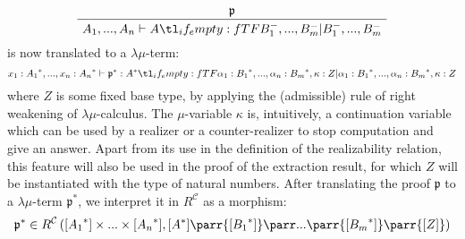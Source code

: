 \documentclass{CSML}
\renewcommand{\ldots}{...}
\newcommand*\ifpresent[3]{\tl_if_empty:fTF{#1}{#3}{#2}}
\newcommand*\AXM[1]{\AxiomC{$#1$}}
\newcommand*\UIM[1]{\UnaryInfC{$#1$}}
\newcommand*\DP\DisplayProof
\newcommand*\Entails{\mathrel{\vdash}}
\newcommand*\BarSep{\mathrel{|}}
\newcommand*\Sequent[3]{#1\Entails#2\ifpresent{#3}{\BarSep}{}#3}
\newcommand*\LogNeg[1]{{#1^-}}
\newcommand*\LogFormA{A}
\newcommand*\LogFormB{B}
\newcommand*\LogProofA{\mathfrak{p}}
\newcommand*\LmSortExtract{Z}
\newcommand*\LmTerm[2]{#1\mathrel{:}#2}
\newcommand*\LmVarA{x}
\newcommand*\LmMVarA\alpha
\newcommand*\LmInterpForm[1]{{#1}^*}
\newcommand*\LmInterpProof[1]{{#1}^*}
\newcommand*\CatC{\mathcal{C}}
\newcommand*\CatR{R}
\newcommand*\CatRC{\CatExp{\CatR}{\CatC}}
\newcommand*\CatTimes\times
\newcommand*\CatExp[2]{#1^{#2}}
\newcommand*\CatPar\parr
\newcommand*\CatInterpSort[1]{{\left[#1\right]}}
\begin{document}
$$\AXM{\LogProofA}\UIM{\Sequent{\LogFormA_1,\ldots,\LogFormA_n}{\LogFormA}{\LogNeg{\LogFormB_1},\ldots,\LogNeg{\LogFormB_m}}}\DP$$
is now translated to a $\lambda\mu$-term:
$$\Sequent{\LmTerm{\LmVarA_1}{\LmInterpForm{\LogFormA_1}},\ldots,\LmTerm{\LmVarA_n}{\LmInterpForm{\LogFormA_n}}}{\LmTerm{\LmInterpProof{\LogProofA}}{\LmInterpForm{\LogFormA}}}{\LmTerm{\LmMVarA_1}{\LmInterpForm{\LogFormB_1}},\ldots,\LmTerm{\LmMVarA_n}{\LmInterpForm{\LogFormB_m}},\LmTerm{\kappa}{\LmSortExtract}}$$
where $\LmSortExtract$ is some fixed base type, by applying the (admissible) rule of right weakening of $\lambda\mu$-calculus. The $\mu$-variable $\kappa$ is, intuitively, a continuation variable which can be used by a realizer or a counter-realizer to stop computation and give an answer. Apart from its use in the definition of the realizability relation, this feature will also be used in the proof of the extraction result, for which $\LmSortExtract$ will be instantiated with the type of natural numbers. After translating the proof $\LogProofA$ to a $\lambda\mu$-term $\LmInterpProof{\LogProofA}$, we interpret it in $\CatRC$ as a morphism:
$$\LmInterpProof{\LogProofA}\in\CatRC\left(\CatInterpSort{\LmInterpForm{\LogFormA_1}}\CatTimes\ldots\CatTimes\CatInterpSort{\LmInterpForm{\LogFormA_n}},\CatInterpSort{\LmInterpForm{\LogFormA}}\CatPar\CatInterpSort{\LmInterpForm{\LogFormB_1}}\CatPar\ldots\CatPar\CatInterpSort{\LmInterpForm{\LogFormB_m}}\CatPar\CatInterpSort{\LmSortExtract}\right)$$
\end{document}
